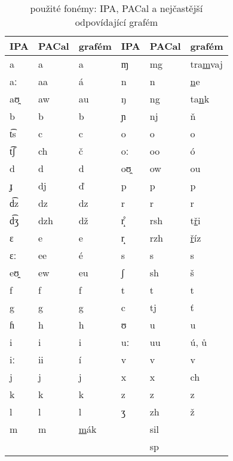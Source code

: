 \begin{table}[htpb]
\begin{center}
\begin{tabular}{|l|l|l||l|l|l|}
\hline
IPA & PACal & grafém & IPA & PACal & grafém \\
\hline
a  & a   & a      &     ɱ  & mg  & tra\underline{m}vaj \\
aː & aa  & á      &     n  & n   & \underline{n}e \\
aʊ̯ & aw  & au     &     ŋ  & ng  & ta\underline{n}k \\
b  & b   & b      &     ɲ  & nj  & \v{n} \\
t͡s & c   & c      &     o  & o   & o \\
t͡ʃ & ch  & č      &     oː & oo  & ó \\
d  & d   & d      &     oʊ̯ & ow  & ou \\
ɟ  & dj  & \v{d}  &     p  & p   & p \\
d͡z & dz  & dz     &     r  & r   & r \\
d͡ʒ & dzh & dž     &     r̝̊  & rsh & t\underline{\v{r}}i \\
ɛ  & e   & e      &     r̝  & rzh & \underline{\v{r}}íz \\
ɛː & ee  & é      &     s  & s   & s \\
eʊ̯ & ew  & eu     &     ʃ  & sh  & š \\
f  & f   & f      &     t  & t   & t \\
g  & g   & g      &     c  & tj  & \v{t} \\
ɦ  & h   & h      &     ʊ  & u   & u \\
i  & i   & i      &     uː & uu  & ú, \r{u} \\
iː & ii  & í      &     v  & v   & v \\
j  & j   & j      &     x  & x   & ch \\
k  & k   & k      &     z  & z   & z \\
l  & l   & l      &     ʒ  & zh  & ž \\
m  & m   & \underline{m}ák
                  &        & sil & \\
   &     &        &        & sp  & \\
\hline
\end{tabular}
\caption{použité fonémy: IPA, PACal a nejčastější odpovídající
grafém}\label{tab:phones}
\end{center}
\end{table}
\normalfont

